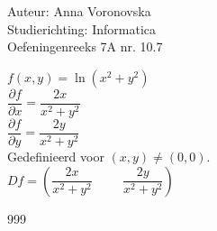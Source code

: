\documentclass[a4paper]{article}
\begin{document}
  
\noindent \large Auteur: Anna Voronovska \\
\noindent \large Studierichting: Informatica\\
\noindent \large Oefeningenreeks 7A nr. 10.7\\

\medskip

\normalsize

$f(x,y) = \ln(x^2+y^2)$\\

$\dfrac{\partial f}{\partial x} = \dfrac{2x}{x^2+y^2}$\\

$\dfrac{\partial f}{\partial y} = \dfrac{2y}{x^2+y^2}$\\

Gedefinieerd voor $(x,y) \neq (0,0)$.\\

$Df = \left(\dfrac{2x}{x^2+y^2} \hspace{1cm} \dfrac{2y}{x^2+y^2}\right)$\\

\begin{thebibliography}{999}
\end{thebibliography}
\end{document}
